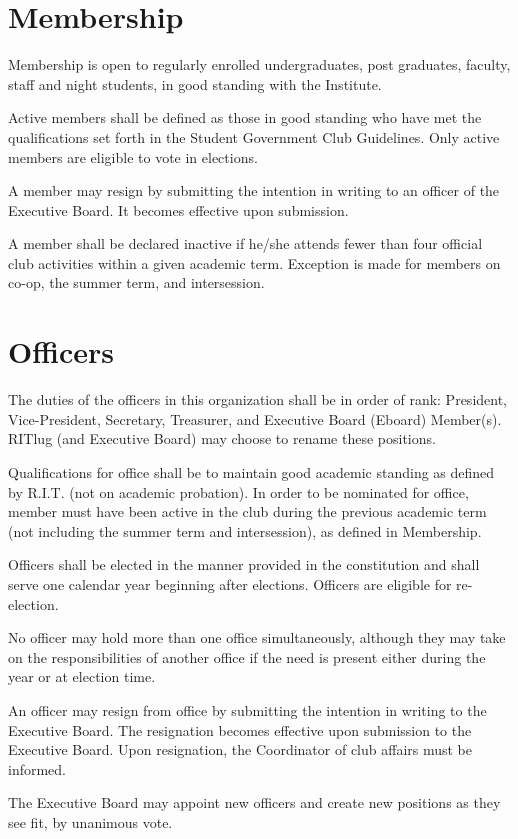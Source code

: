 \section{Membership}
\begin{subroutines}
\item Membership is open to regularly enrolled undergraduates, post graduates, faculty, staff and night students, in good standing with the Institute.
\item Active members shall be defined as those in good standing who have met the qualifications set forth in the Student Government Club Guidelines. Only active members are eligible to vote in elections.
\item A member may resign by submitting the intention in writing to an officer of the Executive Board. It becomes effective upon submission.
\item A member shall be declared inactive if he/she attends fewer than four official club activities within a given academic term. Exception is made for members on co-op, the summer term, and intersession.
\end{subroutines}

\section{Officers}
\begin{subroutines}
\item The duties of the officers in this organization shall be in order of rank: President, Vice-President, Secretary, Treasurer, and Executive Board (Eboard) Member(s). RITlug (and Executive Board) may choose to rename these positions.
\item Qualifications for office shall be to maintain good academic standing as defined by R.I.T. (not on academic probation). In order to be nominated for office, member must have been active in the club during the previous academic term (not including the summer term and intersession), as defined in Membership.
\item Officers shall be elected in the manner provided in the constitution and shall serve one calendar year beginning after elections. Officers are eligible for re-election.
\item No officer may hold more than one office simultaneously, although they may take on the responsibilities of another office if the need is present either during the year or at election time.
\item An officer may resign from office by submitting the intention in writing to the Executive Board. The resignation becomes effective upon submission to the Executive Board. Upon resignation, the Coordinator of club affairs must be informed.
\item The Executive Board may appoint new officers and create new positions as they see fit, by unanimous vote.
\end{subroutines}

